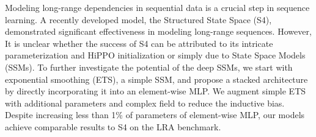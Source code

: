 Modeling long-range dependencies in sequential data is a crucial step in sequence learning.  A recently developed model, the Structured State Space (S4),  demonstrated significant effectiveness in modeling long-range sequences. However, It is unclear whether the success of S4 can be attributed to its intricate parameterization and HiPPO initialization or simply due to State Space Models (SSMs). To further investigate the potential of the deep SSMs, we start with exponential smoothing (ETS), a simple SSM, and propose a stacked architecture by directly incorporating it into an element-wise MLP. We augment simple ETS with additional parameters and complex field to reduce the inductive bias. Despite increasing less than 1\% of parameters of element-wise MLP, our models achieve comparable results to S4 on the LRA benchmark.